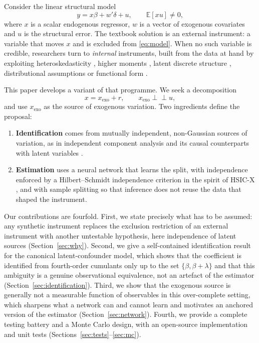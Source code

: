 \documentclass[11pt]{article}
\theoremstyle{definition}
\theoremstyle{remark}
\newcommand{\E}{\mathbb{E}}
\newcommand{\indep}{\perp\!\!\!\perp}
\newcommand{\xexo}{x_{\mathrm{exo}}}
\begin{document}
Consider the linear structural model
\begin{equation}\label{eq:model}
  y = x\beta + w'\delta + u, \qquad \E[xu]\neq 0,
\end{equation}
where $x$ is a scalar endogenous regressor, $w$ is a vector of exogenous covariates and $u$ is the
structural error. The textbook solution is an external instrument: a variable that moves $x$ and is
excluded from \eqref{eq:model}. When no such variable is credible, researchers turn to
\emph{internal} instruments, built from the data at hand by exploiting heteroskedasticity
\citep{rigobon2003,lewbel2012}, higher moments \citep{lewbel1997,erickson2002}, latent discrete
structure \citep{ebbes2005}, distributional assumptions \citep{parkgupta2012} or functional form
\citep{dong2026sp}.

This paper develops a variant of that programme. We seek a decomposition
\begin{equation}\label{eq:split}
  x = \xexo + r, \qquad \xexo \indep u,
\end{equation}
and use $\xexo$ as the source of exogenous variation. Two ingredients define the proposal:
\begin{enumerate}[label=(\roman*)]
  \item \textbf{Identification} comes from mutually independent, non-Gaussian sources of variation,
  as in independent component analysis \citep[ICA;][]{comon1994} and its causal counterparts with
  latent variables \citep{hoyer2008,salehkaleybar2020,wang2023,tramontano2025}.
  \item \textbf{Estimation} uses a neural network that learns the split, with independence enforced
  by a Hilbert--Schmidt independence criterion \citep[HSIC;][]{gretton2005,gretton2008} in the
  spirit of HSIC-X \citep{saengkyongam2022}, and with sample splitting so that inference does not
  reuse the data that shaped the instrument.
\end{enumerate}

Our contributions are fourfold. First, we state precisely what has to be assumed: any synthetic
instrument replaces the exclusion restriction of an external instrument with another untestable
hypothesis, here independence of latent sources (Section~\ref{sec:why}). Second, we give a
self-contained identification result for the canonical latent-confounder model, which shows that
the coefficient is identified from fourth-order cumulants only up to the set $\{\beta,\beta+\lambda\}$
and that this ambiguity is a genuine observational equivalence, not an artefact of the estimator
(Section~\ref{sec:identification}). Third, we show that the exogenous source is generally not a
measurable function of observables in this over-complete setting, which sharpens what a network can
and cannot learn and motivates an anchored version of the estimator (Section~\ref{sec:network}).
Fourth, we provide a complete testing battery and a Monte Carlo design, with an open-source
implementation and unit tests (Sections~\ref{sec:tests}--\ref{sec:mc}).
\end{document}
